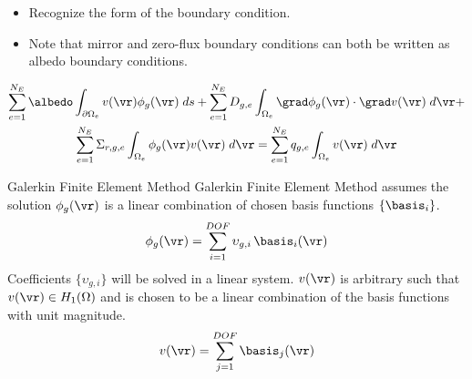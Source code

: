 \begin{frame}
  \begin{itemize}
    \item Recognize the form of the boundary condition.
    \item Note that mirror and zero-flux boundary conditions can both be written
      as albedo boundary conditions.
  \end{itemize}
  \begin{multline}
    \label{eq:element_boundary}
    \sum_{e=1}^{N_E} \albedo \int_{\partial \Omega_e} v(\vr) 
      \phi_g(\vr) \;ds + \sum_{e=1}^{N_E} D_{g,e}
      \int_{\Omega_e} \grad \phi_g(\vr) \cdot \grad v(\vr) \; d\vr + \\
      \sum_{e=1}^{N_E} \Sigma_{r,g,e} \int_{\Omega_e} \phi_g(\vr) v(\vr) 
      \; d\vr =
      \sum_{e=1}^{N_E} q_{g,e} \int_{\Omega_e} v(\vr) \; d\vr
  \end{multline}
\end{frame}

\begin{frame}{Galerkin Finite Element Method}
  Galerkin Finite Element Method assumes the solution $\phi_g(\vr)$ is a linear
  combination of chosen basis functions $\{\basis_i\}$.
  \begin{equation} 
    \label{eq:linear_combination}
    \phi_g(\vr) = \sum_{i=1}^{DOF} \upsilon_{g,i} \, \basis_i(\vr)
  \end{equation}
  Coefficients $\{\upsilon_{g,i}\}$ will be solved in a linear system.
  $v(\vr)$ is arbitrary such that $v(\vr) \in H_1(\Omega)$ and is chosen to be a
  linear combination of the basis functions with unit magnitude.
  \begin{equation} 
    \label{eq:linear_superposition}
    v(\vr) = \sum_{j=1}^{DOF} \basis_j(\vr)
  \end{equation}
\end{frame}

